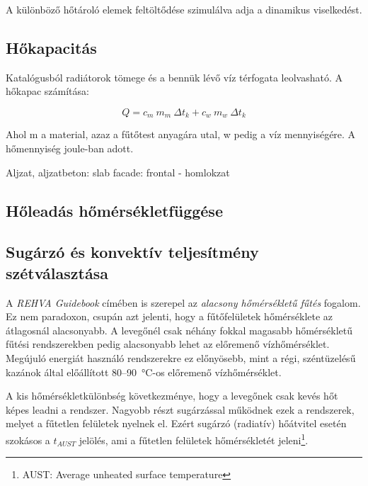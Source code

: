 
A különböző hőtároló elemek feltöltődése szimulálva adja a dinamikus viselkedést.


\subsection{Hőkapacitás}

Katalógusból radiátorok tömege és a bennük lévő víz térfogata leolvasható. A hőkapac számítása:

\begin{equation} \label{eq_hotartalom}
Q = c_{m} ~ m_m ~ \Delta t_k + c_{w} ~ m_w ~ \Delta t_k
\end{equation}

Ahol m a material, azaz a fűtőtest anyagára utal, w pedig a víz mennyiségére. A hőmennyiség joule-ban adott.

Aljzat, aljzatbeton: slab
facade: frontal - homlokzat


\subsection{Hőleadás hőmérsékletfüggése}


\subsection{Sugárzó és konvektív teljesítmény szétválasztása}

A \textit{REHVA Guidebook} \cite{RehvaGuidebookNo7} címében is szerepel az \textit{alacsony hőmérsékletű fűtés} fogalom. Ez nem paradoxon, csupán azt jelenti, hogy a fűtőfelületek hőmérséklete az átlagosnál alacsonyabb. A levegőnél csak néhány fokkal magasabb hőmérsékletű fűtési rendszerekben pedig alacsonyabb lehet az előremenő vízhőmérséklet. Megújuló energiát használó rendszerekre ez előnyösebb, mint a régi, széntüzelésű kazánok által előállított 80--\SI{90}{\celsius}-os előremenő vízhőmérséklet.

A kis hőmérsékletkülönbség következménye, hogy a levegőnek csak kevés hőt képes leadni a rendszer. Nagyobb részt sugárzással működnek ezek a rendszerek, melyet a fűtetlen felületek nyelnek el. Ezért sugárzó (radiatív) hőátvitel esetén szokásos a $t_{AUST}$ jelölés, ami a fűtetlen felületek hőmérsékletét jeleni\footnote{AUST: Average unheated surface temperature}.

